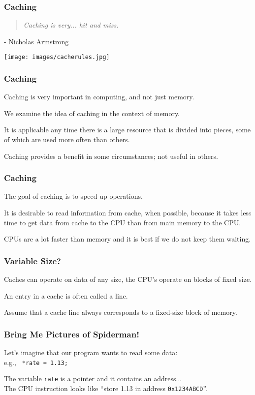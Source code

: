 \begin{frame}
\frametitle{Caching}

\vspace{5em}

\begin{quote}
\textit{Caching is very... hit and miss.}
\end{quote}
\hfill - Nicholas Armstrong

\begin{center}
	\texttt{[image: images/cacherules.jpg]}
\end{center}

\end{frame}

\begin{frame}
\frametitle{Caching}

Caching is very important in computing, and not just memory. 

We examine the idea of caching in the context of memory.

It is applicable any time there is a large resource that is divided into pieces, some of which are used more often than others. 

Caching provides a benefit in some circumstances; not useful in others. 


\end{frame}

\begin{frame}
\frametitle{Caching}

The goal of caching is to speed up operations. 

It is desirable to read information from cache, when possible, because it takes less time to get data from cache to the CPU than from main memory to the CPU. 

CPUs are a lot faster than memory and it is best if we do not keep them waiting.

\end{frame}

\begin{frame}
\frametitle{Variable Size?}

Caches can operate on data of any size, the CPU's operate on blocks of fixed size. 

An entry in a cache is often called a \alert{line}. 

Assume that a cache line always corresponds to a fixed-size block of memory.

\end{frame}

\begin{frame}
\frametitle{Bring Me Pictures of Spiderman!}

Let's imagine that our program wants to read some data:\\
\quad e.g., \texttt{ *rate = 1.13; }

The variable \texttt{rate} is a pointer and it contains an address...\\
\quad The CPU instruction looks like ``store 1.13 in address \texttt{0x1234ABCD}''.

\end{frame}

